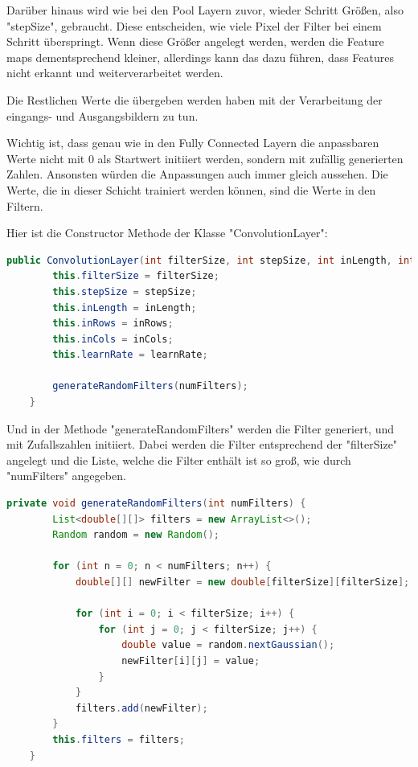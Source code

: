 \documentclass[12pt]{article}
\begin{document}
Darüber hinaus wird wie bei den Pool Layern zuvor, wieder Schritt Größen, also "stepSize", gebraucht. Diese entscheiden, wie viele Pixel der Filter bei einem Schritt überspringt. Wenn diese Größer angelegt werden, werden die Feature maps dementsprechend kleiner, allerdings kann das dazu führen, dass Features nicht erkannt und weiterverarbeitet werden. 

Die Restlichen Werte die übergeben werden haben mit der Verarbeitung der eingangs- und Ausgangsbildern zu tun.

Wichtig ist, dass genau wie in den Fully Connected Layern die anpassbaren Werte nicht mit 0 als Startwert initiiert werden, sondern mit zufällig generierten Zahlen. Ansonsten würden die Anpassungen auch immer gleich aussehen. Die Werte, die in dieser Schicht trainiert werden können, sind die Werte in den Filtern.

Hier ist die Constructor Methode der Klasse "ConvolutionLayer":

\begin{lstlisting}[language=Java]
public ConvolutionLayer(int filterSize, int stepSize, int inLength, int inRows, int inCols, int numFilters, double learnRate) {
        this.filterSize = filterSize;
        this.stepSize = stepSize;
        this.inLength = inLength;
        this.inRows = inRows;
        this.inCols = inCols;
        this.learnRate = learnRate;

        generateRandomFilters(numFilters);
    }
\end{lstlisting}

Und in der Methode "generateRandomFilters" werden die Filter generiert, und mit Zufallszahlen initiiert. Dabei werden die Filter entsprechend der "filterSize" angelegt und die Liste, welche die Filter enthält ist so groß, wie durch "numFilters" angegeben.

\begin{lstlisting}[language=Java]
private void generateRandomFilters(int numFilters) {
        List<double[][]> filters = new ArrayList<>();
        Random random = new Random();

        for (int n = 0; n < numFilters; n++) {
            double[][] newFilter = new double[filterSize][filterSize];

            for (int i = 0; i < filterSize; i++) {
                for (int j = 0; j < filterSize; j++) {
                    double value = random.nextGaussian();
                    newFilter[i][j] = value;
                }
            }
            filters.add(newFilter);
        }
        this.filters = filters;
    }
\end{lstlisting}
\end{document}
